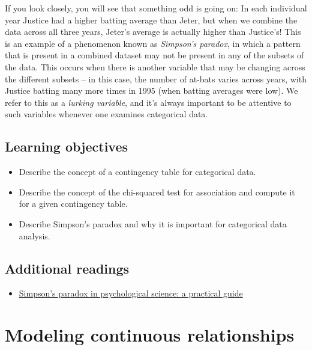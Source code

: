 \documentclass[12pt,]{book}
\providecommand{\tightlist}{%
  \setlength{\itemsep}{0pt}\setlength{\parskip}{0pt}}
\theoremstyle{definition}
\theoremstyle{definition}
\theoremstyle{definition}
\theoremstyle{remark}
\begin{document}
If you look closely, you will see that something odd is going on: In each individual year Justice had a higher batting average than Jeter, but when we combine the data across all three years, Jeter's average is actually higher than Justice's! This is an example of a phenomenon known as \emph{Simpson's paradox}, in which a pattern that is present in a combined dataset may not be present in any of the subsets of the data. This occurs when there is another variable that may be changing across the different subsets -- in this case, the number of at-bats varies across years, with Justice batting many more times in 1995 (when batting averages were low). We refer to this as a \emph{lurking variable}, and it's always important to be attentive to such variables whenever one examines categorical data.

\hypertarget{learning-objectives-11}{%
\section{Learning objectives}\label{learning-objectives-11}}

\begin{itemize}
\tightlist
\item
  Describe the concept of a contingency table for categorical data.
\item
  Describe the concept of the chi-squared test for association and compute it for a given contingency table.
\item
  Describe Simpson's paradox and why it is important for categorical data analysis.
\end{itemize}

\hypertarget{additional-readings}{%
\section{Additional readings}\label{additional-readings}}

\begin{itemize}
\tightlist
\item
  \href{https://www.frontiersin.org/articles/10.3389/fpsyg.2013.00513/full}{Simpson's paradox in psychological science: a practical guide}
\end{itemize}

\hypertarget{modeling-continuous-relationships}{%
\chapter{Modeling continuous relationships}\label{modeling-continuous-relationships}}
\end{document}
